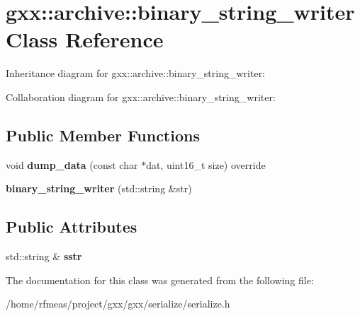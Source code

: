 \hypertarget{classgxx_1_1archive_1_1binary__string__writer}{}\section{gxx\+:\+:archive\+:\+:binary\+\_\+string\+\_\+writer Class Reference}
\label{classgxx_1_1archive_1_1binary__string__writer}


Inheritance diagram for gxx\+:\+:archive\+:\+:binary\+\_\+string\+\_\+writer\+:


Collaboration diagram for gxx\+:\+:archive\+:\+:binary\+\_\+string\+\_\+writer\+:
\subsection*{Public Member Functions}
\begin{DoxyCompactItemize}
\item 
void {\bfseries dump\+\_\+data} (const char $\ast$dat, uint16\+\_\+t size) override\hypertarget{classgxx_1_1archive_1_1binary__string__writer_ae4512b00c3764d825089d4b36fd56115}{}\label{classgxx_1_1archive_1_1binary__string__writer_ae4512b00c3764d825089d4b36fd56115}

\item 
{\bfseries binary\+\_\+string\+\_\+writer} (std\+::string \&str)\hypertarget{classgxx_1_1archive_1_1binary__string__writer_a99ad4c8bb49e1e8ebc0009a4be8e61d0}{}\label{classgxx_1_1archive_1_1binary__string__writer_a99ad4c8bb49e1e8ebc0009a4be8e61d0}

\end{DoxyCompactItemize}
\subsection*{Public Attributes}
\begin{DoxyCompactItemize}
\item 
std\+::string \& {\bfseries sstr}\hypertarget{classgxx_1_1archive_1_1binary__string__writer_af2aa4f19499b335fadcb430a43a353eb}{}\label{classgxx_1_1archive_1_1binary__string__writer_af2aa4f19499b335fadcb430a43a353eb}

\end{DoxyCompactItemize}


The documentation for this class was generated from the following file\+:\begin{DoxyCompactItemize}
\item 
/home/rfmeas/project/gxx/gxx/serialize/serialize.\+h\end{DoxyCompactItemize}
